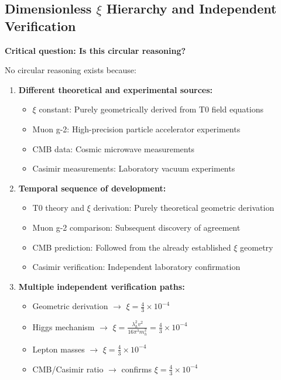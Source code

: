 	\subsection{Dimensionless $\xi$ Hierarchy and Independent Verification}
	
	\textbf{Critical question: Is this circular reasoning?}
	
	No circular reasoning exists because:
	
	\begin{enumerate}
		\item \textbf{Different theoretical and experimental sources:}
		\begin{itemize}
			\item $\xi$ constant: Purely geometrically derived from T0 field equations
			\item Muon g-2: High-precision particle accelerator experiments
			\item CMB data: Cosmic microwave measurements
			\item Casimir measurements: Laboratory vacuum experiments
		\end{itemize}
		
		\item \textbf{Temporal sequence of development:}
		\begin{itemize}
			\item T0 theory and $\xi$ derivation: Purely theoretical geometric derivation
			\item Muon g-2 comparison: Subsequent discovery of agreement
			\item CMB prediction: Followed from the already established $\xi$ geometry
			\item Casimir verification: Independent laboratory confirmation
		\end{itemize}
		
		\item \textbf{Multiple independent verification paths:}
		\begin{itemize}
			\item Geometric derivation $\to$ $\xi = \frac{4}{3} \times 10^{-4}$
			\item Higgs mechanism $\to$ $\xi = \frac{\lambda_h^2 v^2}{16\pi^3 m_h^2} = \frac{4}{3} \times 10^{-4}$
			\item Lepton masses $\to$ $\xi = \frac{4}{3} \times 10^{-4}$
			\item CMB/Casimir ratio $\to$ confirms $\xi = \frac{4}{3} \times 10^{-4}$
		\end{itemize}
	\end{enumerate}
	
